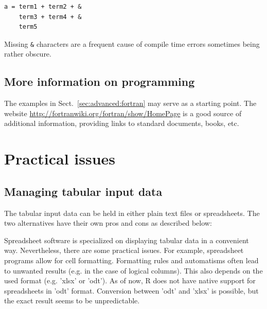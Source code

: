 \documentclass[times,onecolumn]{article}
\begin{document}
\begin{shaded}
\begin{small}
\begin{verbatim}
a = term1 + term2 + &
    term3 + term4 + &
    term5
\end{verbatim}
\end{small}
\end{shaded}

Missing \verb|&| characters are a frequent cause of compile time errors sometimes being rather obscure.

\subsection{More information on  programming}

The examples in Sect.~\ref{sec:advanced:fortran} may serve as a starting point. The website \url{http://fortranwiki.org/fortran/show/HomePage} is a good source of additional information, providing links to standard documents, books, etc.


\section{Practical issues} \label{sec:practical}

\subsection{Managing tabular input data}

The tabular input data can be held in either plain text files or spreadsheets. The two alternatives have their own pros and cons as described below:

Spreadsheet software is specialized on displaying tabular data in a convenient way. Nevertheless, there are some practical issues. For example, spreadsheet programs allow for cell formatting. Formatting rules and automatisms often lead to unwanted results (e.g. in the case of logical columns). This also depends on the used format (e.g. 'xlsx' or 'odt'). As of now, R does not have native support for spreadsheets in 'odt' format. Conversion between 'odt' and 'xlsx' is possible, but the exact result seems to be unpredictable.
\end{document}
